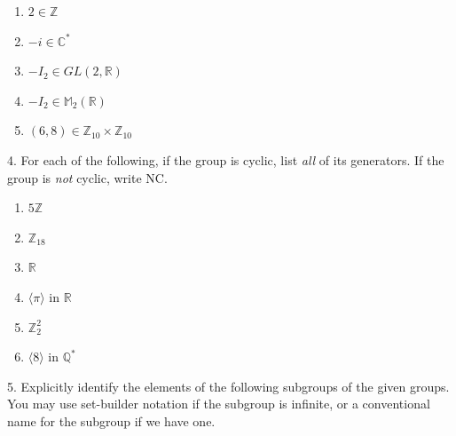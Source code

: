 \documentclass[10pt,]{book}
\theoremstyle{plain}
\theoremstyle{definition}
\theoremstyle{definition}
\theoremstyle{definition}
\theoremstyle{definition}
\numberwithin{equation}{section}
\def\Z{\mathbb{Z}}
\def\R{\mathbb{R}}
\def\Q{\mathbb{Q}}
\def\C{\mathbb{C}}
\def\M{\mathbb{M}}
\newcommand{\amp}{&}
\begin{document}
\begin{exerciselist}
\begin{enumerate}[label=(\alph*)]
\item\hypertarget{li-223}{}\(2\in \Z\)%
\item\hypertarget{li-224}{}\(-i\in \C^*\)%
\item\hypertarget{li-225}{}\(-I_2\in GL(2,\R)\)%
\item\hypertarget{li-226}{}\(-I_2\in \M_2(\R)\)%
\item\hypertarget{li-227}{}\((6,8)\in \Z_{10}\times \Z_{10}\)%
\end{enumerate}
%
\par\smallskip
\item[4.]\hypertarget{exercise-31}{}For each of the following, if the group is cyclic, list \emph{all} of its generators. If the group is \emph{not} cyclic, write NC. \leavevmode%
\begin{enumerate}[label=(\alph*)]
\item\hypertarget{li-233}{}\(5\Z\)%
\item\hypertarget{li-234}{}\(\Z_{18}\)%
\item\hypertarget{li-235}{}\(\R\)%
\item\hypertarget{li-236}{}\(\langle \pi\rangle\) in \(\R\)%
\item\hypertarget{li-237}{}\(\Z_2^2\)%
\item\hypertarget{li-238}{}\(\langle 8\rangle\) in \(\Q^*\)%
\end{enumerate}
%
\par\smallskip
\item[5.]\hypertarget{exercise-32}{}Explicitly identify the elements of the following subgroups of the given groups. You may use set-builder notation if the subgroup is infinite, or a conventional name for the subgroup if we have one. \leavevmode%
\begin{enumerate}[label=(\alph*)]
\item\hypertarget{li-245}{}\(\langle 3\rangle\) in \(\Z\)%
\item\hypertarget{li-246}{}\(\langle i\rangle\) in \(C^*\)%
\item\hypertarget{li-247}{}\(\langle A\rangle\), for \(A=\left[ \begin{array}{cc}
1 \amp  0 \\
0 \amp  0
\end{array} 
\right]\in \M_2(\R)\)%
\item\hypertarget{li-248}{}\(\langle (2,3)\rangle\) in \(\Z_4\times \Z_5\)%
\item\hypertarget{li-249}{}\(\langle B\rangle\), for \(B=\left[ \begin{array}{cc}

\end{array}
\end{enumerate}
\end{exerciselist}
\end{document}

